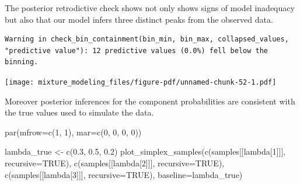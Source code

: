 \documentclass[
  letterpaper,
  DIV=11,
  numbers=noendperiod]{scrartcl}
\newenvironment{Shaded}{\begin{snugshade}}{\end{snugshade}}
\newcommand{\AttributeTok}[1]{\textcolor[rgb]{0.40,0.45,0.13}{#1}}
\newcommand{\ConstantTok}[1]{\textcolor[rgb]{0.56,0.35,0.01}{#1}}
\newcommand{\DecValTok}[1]{\textcolor[rgb]{0.68,0.00,0.00}{#1}}
\newcommand{\FloatTok}[1]{\textcolor[rgb]{0.68,0.00,0.00}{#1}}
\newcommand{\FunctionTok}[1]{\textcolor[rgb]{0.28,0.35,0.67}{#1}}
\newcommand{\NormalTok}[1]{\textcolor[rgb]{0.00,0.23,0.31}{#1}}
\newcommand{\OtherTok}[1]{\textcolor[rgb]{0.00,0.23,0.31}{#1}}
\newcommand{\SpecialCharTok}[1]{\textcolor[rgb]{0.37,0.37,0.37}{#1}}
\newcommand{\StringTok}[1]{\textcolor[rgb]{0.13,0.47,0.30}{#1}}
\begin{document}
The posterior retrodictive check shows not only shows signs of model
inadequacy but also that our model infers three distinct peaks from the
observed data.

\begin{Shaded}
\end{Shaded}

\begin{verbatim}
Warning in check_bin_containment(bin_min, bin_max, collapsed_values,
"predictive value"): 12 predictive values (0.0%) fell below the binning.
\end{verbatim}

\texttt{[image: mixture\_modeling\_files/figure-pdf/unnamed-chunk-52-1.pdf]}

Moreover posterior inferences for the component probabilities are
consistent with the true values used to simulate the data.

\begin{Shaded}
\begin{Highlighting}[]
\FunctionTok{par}\NormalTok{(}\AttributeTok{mfrow=}\FunctionTok{c}\NormalTok{(}\DecValTok{1}\NormalTok{, }\DecValTok{1}\NormalTok{), }\AttributeTok{mar=}\FunctionTok{c}\NormalTok{(}\DecValTok{0}\NormalTok{, }\DecValTok{0}\NormalTok{, }\DecValTok{0}\NormalTok{, }\DecValTok{0}\NormalTok{))}

\NormalTok{lambda\_true }\OtherTok{\textless{}{-}} \FunctionTok{c}\NormalTok{(}\FloatTok{0.3}\NormalTok{, }\FloatTok{0.5}\NormalTok{, }\FloatTok{0.2}\NormalTok{)}
\FunctionTok{plot\_simplex\_samples}\NormalTok{(}\FunctionTok{c}\NormalTok{(samples[[}\StringTok{\textquotesingle{}lambda[1]\textquotesingle{}}\NormalTok{]], }\AttributeTok{recursive=}\ConstantTok{TRUE}\NormalTok{),}
                     \FunctionTok{c}\NormalTok{(samples[[}\StringTok{\textquotesingle{}lambda[2]\textquotesingle{}}\NormalTok{]], }\AttributeTok{recursive=}\ConstantTok{TRUE}\NormalTok{),}
                     \FunctionTok{c}\NormalTok{(samples[[}\StringTok{\textquotesingle{}lambda[3]\textquotesingle{}}\NormalTok{]], }\AttributeTok{recursive=}\ConstantTok{TRUE}\NormalTok{),}
                     \AttributeTok{baseline=}\NormalTok{lambda\_true)}
\end{Highlighting}
\end{Shaded}
\end{document}
